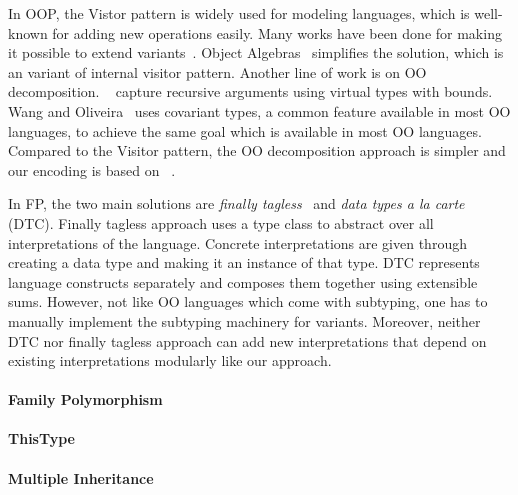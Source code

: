 In OOP, the Vistor pattern is widely used for modeling languages, which is
well-known for adding new operations easily. Many works
have been done for making it possible to extend variants~\cite{oliveira07genericity,oliveira09modular}.
Object Algebras~\cite{bruno12oa} simplifies the solution, which is an variant of
internal visitor pattern.
Another line of work is on OO decomposition. ~\cite{zenger} capture recursive
arguments using virtual types with bounds. Wang and Oliveira~\cite{eptrivially16}
uses covariant types, a common feature available in most OO languages, to achieve the same goal which is available in most OO languages.
Compared to the Visitor pattern, the OO decomposition approach is simpler and our encoding is based on ~\cite{eptrivially16}.

In FP, the two main solutions are \emph{finally
  tagless}~\cite{carette2009finally} and \emph{data types a la
  carte}~\cite{swierstra2008data} (DTC).
Finally tagless approach uses a type class to abstract over all interpretations
of the language. Concrete interpretations are given through creating a data type and
making it an instance of that type.
DTC represents language constructs separately and composes them together using
extensible sums. However, not like OO languages which come with subtyping, one
has to manually implement the subtyping machinery for variants.
Moreover, neither DTC nor finally tagless approach can add new interpretations
that depend on existing interpretations modularly like our approach.

\paragraph{Family Polymorphism}

\paragraph{ThisType}

\paragraph{Multiple Inheritance}
